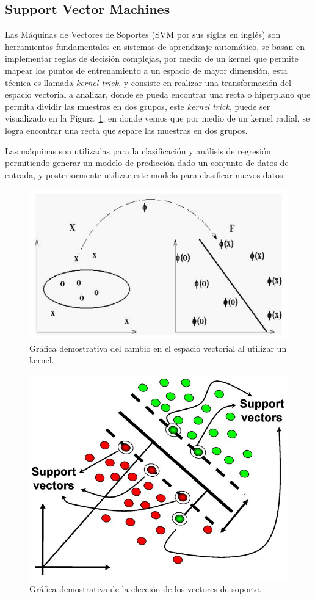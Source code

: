 	\subsection{Support Vector Machines}
	\label{sec:svm}
	Las Máquinas de Vectores de Soportes (SVM por sus siglas en inglés) son herramientas fundamentales en sistemas de aprendizaje automático, se basan en  implementar reglas de decisión complejas, por medio de un kernel que permite mapear los puntos de entrenamiento a un espacio de mayor dimensión, esta técnica es llamada \textit{kernel trick}, y consiste en realizar una transformación del espacio vectorial a analizar, donde se pueda encontrar una recta o hiperplano que permita dividir las muestras en dos grupos, este \textit{kernel trick}, puede ser visualizado en la Figura~\ref{art:fig:kernel_trick}, en donde vemos que por medio de un kernel radial, se logra encontrar una recta que separe las muestras en dos grupos. 
	
	Las máquinas son utilizadas para la clasificación y análisis de regresión permitiendo generar un modelo de predicción dado un conjunto de datos de entrada, y posteriormente utilizar este modelo para clasificar nuevos datos.
	
	\begin{figure}[tb]
		\centering
		\includegraphics[width=.5\textwidth]{Figuras/Diagramas/estado_del_arte/kernel_trick.jpg}
		\caption{Gráfica demostrativa del cambio en el espacio vectorial al utilizar un kernel.}
		\label{art:fig:kernel_trick}
	\end{figure}
	
	\begin{figure}[t]
		\centering
		\includegraphics[width=.5\textwidth]{Figuras/Diagramas/estado_del_arte/support_vectors.jpg}
		\caption{Gráfica demostrativa de la elección de los vectores de soporte.}
		\label{art:fig:support_vectors}
	\end{figure}
		
